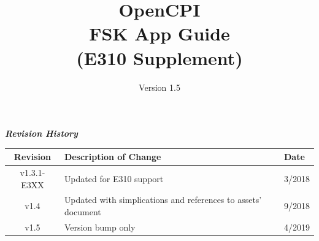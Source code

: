 \def\docTitle{OpenCPI\\ FSK App Guide\\ (E310 Supplement)}
\def\docVersion{1.5}

\date{Version \docVersion} %
\title{\docTitle}
\usepackage{graphicx}
\graphicspath{ {figures/} }
\usepackage{textcomp}


\maketitle
\newpage
	\begin{center}
	\textit{\textbf{Revision History}}
		\begin{table}[H]
		\label{table:revisions} %
			\begin{tabularx}{\textwidth}{|c|X|l|}
			\hline
			\rowcolor{blue}
			\textbf{Revision} & \textbf{Description of Change} & \textbf{Date} \\
			\hline
			v1.3.1-E3XX & Updated for E310 support & 3/2018 \\
			\hline
			v1.4 & Updated with simplications and references to assets' document & 9/2018 \\
			\hline
			v1.5 & Version bump only & 4/2019 \\
			\hline
			\end{tabularx}
		\end{table}
	\end{center}

